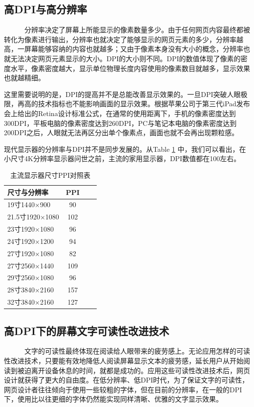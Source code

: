 \documentclass[a4paper]{article}
\begin{document}
\subsection{高DPI与高分辨率}
~~~~~~分辨率决定了屏幕上所能显示的像素数量多少。由于任何网页内容最终都被转化为像素进行输出，分辨率也就决定了能够显示的网页元素的多少，分辨率越高，一屏幕能够容纳的内容也就越多；又由于像素本身没有大小的概念，分辨率也就无法决定网页元素显示的大小。DPI的大小则不同。DPI的数值体现了像素的密度水平，像素密度越大，显示单位物理长度内容使用的像素数目就越多，显示效果也就越精细。

这里需要说明的是，DPI的提高并不是总能改善显示效果的。一旦DPI突破人眼极限，再高的技术指标也不能影响画面的显示效果。根据苹果公司于第三代iPad发布会上给出的Retina设计标准公式，在通常的使用距离下，手机的像素密度达到300DPI，平板电脑的像素密度达到260DPI，PC与笔记本电脑的像素密度达到200DPI之后，人眼就无法再区分出单个像素点，画面也就不会再出现颗粒感。

现代显示器的分辨率与DPI并不是同步发展的。从Table \ref{tb2} 中，我们可以看出，在小尺寸4K分辨率显示器问世之前，主流的家用显示器，DPI数值都在100左右。

\begin{table}[h]
\centering
\begin{tabular}{lccc}  %
\hline
尺寸与分辨率 & PPI \\\hline
19寸1440×900 & 90 \\
21.5寸1920×1080 & 102 \\
23寸1920×1080 & 96 \\
24寸1920×1200  & 94 \\
27寸1920×1080 & 82 \\
27寸2560×1440 & 109 \\
29寸2560×1080 & 96 \\
28寸3840×2160 & 157 \\
32寸3840×2160 & 127\\ \hline
\end{tabular}
\caption{主流显示器尺寸PPI对照表}
\label{tb2}
\end{table}

\subsection{高DPI下的屏幕文字可读性改进技术}
~~~~~~文字的可读性最终体现在阅读给人眼带来的疲劳感上。无论应用怎样的可读性改进技术，只要能有效地降低人阅读屏幕显示文本的疲劳感，延长用户从开始阅读到被迫离开设备休息的时间，就都是成功的。应用这些可读性改进技术后，网页设计就获得了更大的自由度。在低分辨率、低DPI时代，为了保证文字的可读性，网页设计者往往倾向于使用一些较粗的字体，但在目前的分辨率，在一般的DPI下，使用比以往更细的字体仍然能实现同样清晰、优雅的文字显示效果。
\end{document}
